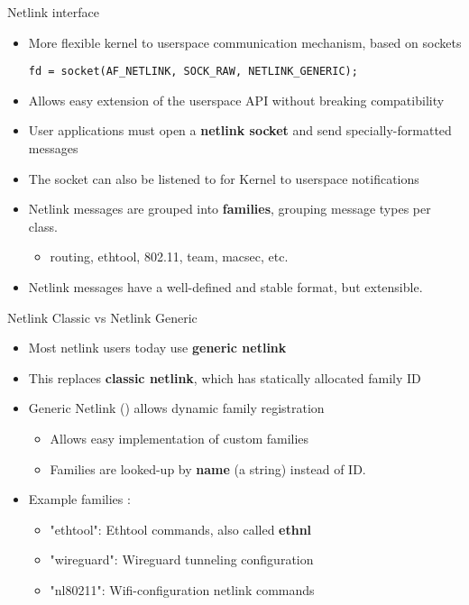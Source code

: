 \begin{frame}[fragile]{Netlink interface}
	\begin{itemize}
		\item More flexible kernel to userspace communication mechanism, based on sockets
			\begin{verbatim}
fd = socket(AF_NETLINK, SOCK_RAW, NETLINK_GENERIC);
			\end{verbatim}
		\item Allows easy extension of the userspace API without breaking compatibility
		\item User applications must open a \textbf{netlink socket} and send specially-formatted messages
		\item The socket can also be listened to for Kernel to userspace notifications
		\item Netlink messages are grouped into \textbf{families}, grouping message types per class.
			\begin{itemize}
				\item routing, ethtool, 802.11, team, macsec, etc. 
			\end{itemize}
		\item Netlink messages have a well-defined and stable format, but extensible.
	\end{itemize}
\end{frame}

\begin{frame}{Netlink Classic vs Netlink Generic}
	\begin{itemize}
		\item Most netlink users today use \textbf{generic netlink}
		\item This replaces \textbf{classic netlink}, which has statically allocated family ID
		\item Generic Netlink () allows dynamic family registration
			\begin{itemize}
				\item Allows easy implementation of custom families
				\item Families are looked-up by \textbf{name} (a string) instead of ID.
			\end{itemize}
		\item Example families :
			\begin{itemize}
				\item "ethtool": Ethtool commands, also called \textbf{ethnl}
				\item "wireguard": Wireguard tunneling configuration
				\item "nl80211": Wifi-configuration netlink commands
			\end{itemize}
	\end{itemize}
\end{frame}

